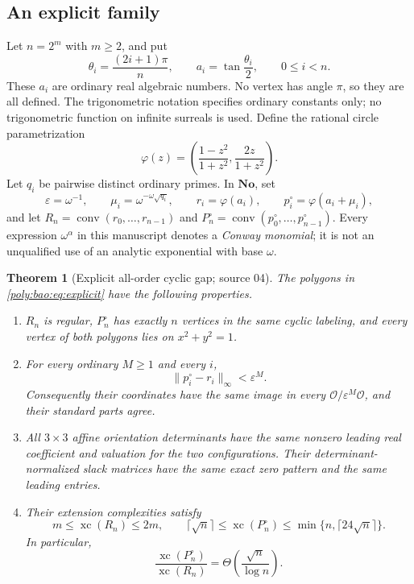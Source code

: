 \documentclass[11pt,a4paper]{article}
\numberwithin{equation}{section}
\newtheorem{theorem}{Theorem}[section]
\theoremstyle{plain}
\newcommand{\No}{\mathbf{No}}
\newcommand{\eps}{\varepsilon}
\newcommand{\conv}{\operatorname{conv}}
\newcommand{\OO}{\mathcal O}
\newcommand{\xc}{\operatorname{xc}}
\newcommand{\ph}{\varphi}
\begin{document}
\subsection{An explicit family}
Let $n=2^m$ with $m\geq2$, and put
\begin{equation}\label{poly:bao:eq:base}
 \theta_i=\frac{(2i+1)\pi}{n},\qquad
 a_i=\tan\frac{\theta_i}{2},\qquad 0\leq i<n.
\end{equation}
These $a_i$ are ordinary real algebraic numbers. No vertex has angle $\pi$,
so they are all defined. The trigonometric notation specifies ordinary
constants only; no trigonometric function on infinite surreals is used.
Define the rational circle parametrization
\begin{equation}\label{poly:bao:eq:phi}
 \ph(z)=\left(\frac{1-z^2}{1+z^2},\frac{2z}{1+z^2}\right).
\end{equation}
Let $q_i$ be pairwise distinct ordinary primes. In $\No$, set
\begin{equation}\label{poly:bao:eq:explicit}
 \eps=\omega^{-1},\qquad
 \mu_i=\omega^{-\omega\sqrt{q_i}},\qquad
 r_i=\ph(a_i),\qquad p^\circ_i=\ph(a_i+\mu_i),
\end{equation}
and let $R_n=\conv(r_0,\ldots,r_{n-1})$ and
$P^\circ_n=\conv(p^\circ_0,\ldots,p^\circ_{n-1})$. Every expression $\omega^\alpha$ in this
manuscript denotes a \emph{Conway monomial}; it is not an unqualified use of
an analytic exponential with base $\omega$.

\begin{theorem}[Explicit all-order cyclic gap; source 04]\label{poly:bao:thm:main}
The polygons in \eqref{poly:bao:eq:explicit} have the following properties.
\begin{enumerate}[label=\textup{(\roman*)}]
\item $R_n$ is regular, $P^\circ_n$ has exactly $n$ vertices in the same cyclic
labeling, and every vertex of both polygons lies on $x^2+y^2=1$.
\item For every ordinary $M\geq1$ and every $i$,
\[
 \|p^\circ_i-r_i\|_\infty<\eps^M.
\]
Consequently their coordinates have the same image in every
$\OO/\eps^M\OO$, and their standard parts agree.
\item All $3\times3$ affine orientation determinants have the same
nonzero leading real coefficient and valuation for the two configurations.
Their determinant-normalized slack matrices have the same exact zero
pattern and the same leading entries.
\item Their extension complexities satisfy
\begin{equation}\label{poly:bao:eq:mainbounds}
 m\leq\xc(R_n)\leq2m,
 \qquad
 \lceil\sqrt n\rceil\leq\xc(P^\circ_n)
 \leq\min\{n,\lceil24\sqrt n\rceil\}.
\end{equation}
In particular,
\[
 \frac{\xc(P^\circ_n)}{\xc(R_n)}
 =\Theta\!\left(\frac{\sqrt n}{\log n}\right).
\]
\end{enumerate}
\end{theorem}
\end{document}
